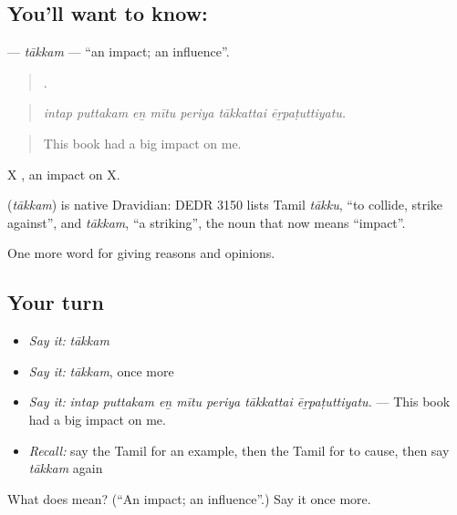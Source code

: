 \subsection*{You'll want to know: }
\textbf{} — \emph{tākkam} — \textquotedblleft{}an impact; an influence\textquotedblright{}.

\begin{quote}
      .
\end{quote}

\begin{quote}
\emph{intap puttakam eṉ mītu periya tākkattai ēṟpaṭuttiyatu.}
\end{quote}

\begin{quote}
This book had a big impact on me.
\end{quote}

X  , an impact on X.

\begin{cousinweb}
\textbf{} (\emph{tākkam}) is native Dravidian: DEDR 3150 lists Tamil \emph{tākku}, \textquotedblleft{}to collide, strike against\textquotedblright{}, and \emph{tākkam}, \textquotedblleft{}a striking\textquotedblright{}, the noun that now means \textquotedblleft{}impact\textquotedblright{}.
\end{cousinweb}

\begin{grammarlens}[title={What you've built}]
One more word for giving reasons and opinions.
\end{grammarlens}

\subsection*{Your turn}
\begin{itemize}
\raggedright
  \item \emph{Say it:} \emph{tākkam}
  \item \emph{Say it:} \emph{tākkam}, once more
  \item \emph{Say it:} \emph{intap puttakam eṉ mītu periya tākkattai ēṟpaṭuttiyatu.} — This book had a big impact on me.
  \item \emph{Recall:} say the Tamil for an example, then the Tamil for to cause, then say \emph{tākkam} again
\end{itemize}

\begin{tcolorbox}[breakable,colback=teal!4,colframe=teal!35!black,title={Before you move on}]
What does  mean? (\textquotedblleft{}An impact; an influence\textquotedblright{}.) Say it once more.
\end{tcolorbox}
